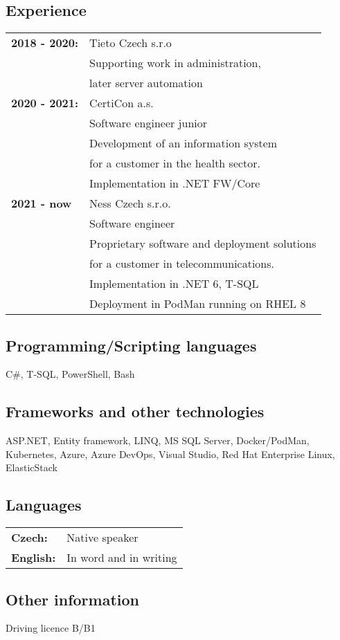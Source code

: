\documentclass[a4paper]{article}
\begin{document}
\subsection*{Experience}
\begin{tabular}{>{\bfseries}l l}
    2018 - 2020: & Tieto Czech s.r.o \\
                 & Supporting work in administration, \\
                 & later server automation \\
    2020 - 2021: & CertiCon a.s. \\
                 & Software engineer junior  \\
                 & Development of an information system \\
                 & for a customer in the health sector. \\
                 & Implementation in .NET FW/Core \\
    2021 - now   & Ness Czech s.r.o. \\
                 & Software engineer \\
                 & Proprietary software and deployment solutions \\
                 & for a customer in telecommunications. \\
                 & Implementation in .NET 6, T-SQL \\
                 & Deployment in PodMan running on RHEL 8 \\
\end{tabular}

\subsection*{Programming/Scripting languages}
C\#, T-SQL, PowerShell, Bash

\subsection*{Frameworks and other technologies}
ASP.NET, Entity framework, LINQ, MS SQL Server, Docker/PodMan, Kubernetes, Azure, Azure DevOps, Visual Studio, Red Hat Enterprise Linux, ElasticStack

\subsection*{Languages}
\begin{tabular}{>{\bfseries}l l}
    Czech: & Native speaker \\
    English: & In word and in writing
\end{tabular}

\subsection*{Other information}
Driving licence B/B1
\end{document}
